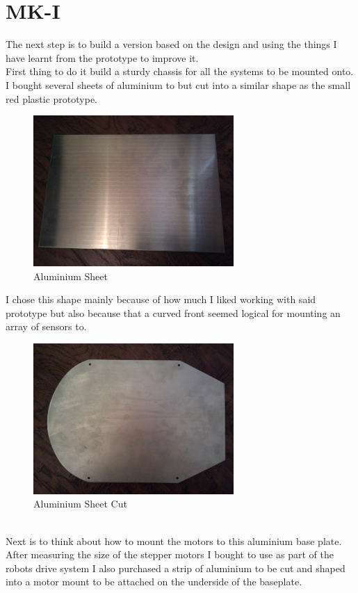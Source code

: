 \section{MK-I}
The next step is to build a version based on the design and using the things I have learnt from the prototype to improve it.
\\First thing to do it build a sturdy chassis for all the systems to be mounted onto.  I bought several sheets of aluminium to but cut into a similar shape as the small red plastic prototype.
\begin{figure}[h]
\centering
        \includegraphics[width=3.0in]  {Images/alu-sheet-2.jpg}
        \caption{Aluminium Sheet}
        \label{Aluminium Sheet}
\end{figure}
I chose this shape mainly because of how much I liked working with said prototype but also because that a curved front seemed logical for mounting an array of sensors to.
\begin{figure}[h]
\centering
        \includegraphics[width=3.0in]  {Images/alu-cut-2.jpg}
        \caption{Aluminium Sheet Cut}
        \label{Aluminium Sheet Cut}
\end{figure}
\\Next is to think about how to mount the motors to this aluminium base plate. After measuring the size of the stepper motors I bought to use as part of the robots drive system I also purchased a strip of aluminium to be cut and shaped into a motor mount to be attached on the underside of the baseplate.
